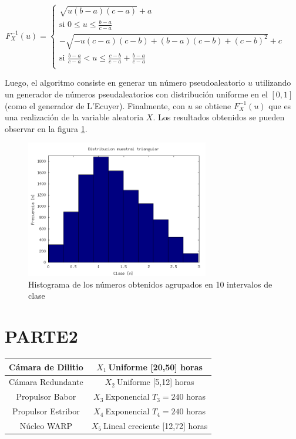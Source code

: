 \documentclass{sig-alternate}
\begin{document}
\begin{equation}
\label{eq:inverse}
F^{-1}_{X}(u) =
\begin{cases}
\sqrt{u(b-a)(c-a)}+a \quad & \\
\text{si } 0 \leq u \leq \frac{b-a}{c-a} & \\
-\sqrt{-u(c-a)(c-b)+(b-a)(c-b)+(c-b)^{2}} + c \quad & \\
\text{si } \frac{b-a}{c-a} < u \leq \frac{c-b}{c-a}+\frac{b-a}{c-a} \\
\end{cases}
\end{equation}

Luego, el algoritmo consiste en generar un n\'umero pseudoaleatorio $u$ utilizando
un generador de n\'umeros pseudaleatorios con distribuci\'on uniforme en el $[0,1]$ (como el generador de L'Ecuyer).
Finalmente, con $u$ se obtiene $F^{-1}_{X}(u)$ que es una realizaci\'on de la variable aleatoria $X$.
Los resultados obtenidos se pueden observar en la figura \ref{fig:triangle}.

\begin{figure}[ht]
\label{fig:triangle}
\includegraphics[width=8cm]{histograma_triangular}
\caption{Histograma de los n\'umeros obtenidos agrupados en 10 intervalos de clase}
\end{figure}

\section{PARTE2}

\begin{tabular}{|c|c|}
 \hline
  C\'amara de Dilitio & $X_{1}~$Uniforme [20,50] horas \\
\hline
  C\'amara Redundante & $X_{2}~$Uniforme [5,12] horas \\
\hline
  Propulsor Babor & $X_{3}~$Exponencial $T_{3}=240$ horas \\
\hline
  Propulsor Estribor & $X_{4}~$Exponencial $T_{4}=240$ horas \\
\hline
  N\'ucleo WARP & $X_{5}~$Lineal creciente [12,72] horas \\
\hline
\end{tabular}
\end{document}
